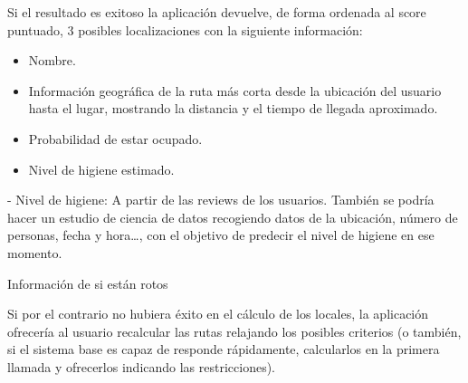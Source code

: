 \documentclass[13pt,a4paper]{article}
\begin{document}
Si el resultado es exitoso la aplicación devuelve, de forma ordenada al score puntuado, 3 posibles localizaciones con la siguiente información:

\begin{itemize}
  \item Nombre.
  \item Información geográfica de la ruta más corta desde la ubicación del usuario hasta el lugar, mostrando la distancia y el tiempo de llegada aproximado.
  \item Probabilidad de estar ocupado.
  \item Nivel de higiene estimado.
\end{itemize}
- Nivel de higiene: A partir de las reviews de los usuarios. También se podría hacer un estudio de ciencia de datos recogiendo datos de la ubicación, número de personas, fecha y hora\dots, con el objetivo de predecir el nivel de higiene en ese momento.

Información de si están rotos

Si por el contrario no hubiera éxito en el cálculo de los locales, la aplicación ofrecería al usuario recalcular las rutas relajando los posibles criterios (o también, si el sistema base es capaz de responde rápidamente, calcularlos en la primera llamada y ofrecerlos indicando las restricciones).



    \setlength{\parskip}{1em}
    \newpage
\end{document}
